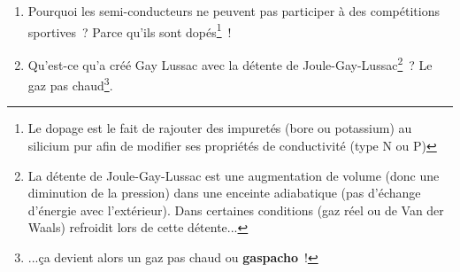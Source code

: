 \documentclass[10pt,a5paper,fullpage]{book}
\begin{document}
\begin{enumerate}
 		\item Pourquoi les semi-conducteurs ne peuvent pas participer à des compétitions sportives~? Parce qu'ils sont dopés\footnote{Le dopage est le fait de rajouter des impuretés (bore ou potassium) au silicium pur afin de modifier ses propriétés de conductivité (type N ou P)}~!
 		\item Qu'est-ce qu'a créé Gay Lussac avec la détente de Joule-Gay-Lussac\footnote{La détente de Joule-Gay-Lussac est une augmentation de volume (donc une diminution de la pression) dans une enceinte adiabatique (pas d'échange d'énergie avec l'extérieur). Dans certaines conditions (gaz réel ou de Van der Waals) refroidit lors de cette détente...}~? Le gaz pas chaud\footnote{...ça devient alors un gaz pas chaud ou \textbf{gaspacho}~!}.
	\end{enumerate}
	
\end{document}
